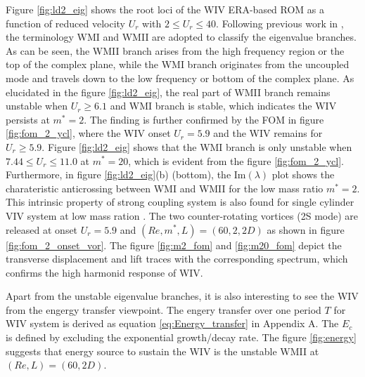 Figure \ref{fig:ld2_eig} shows the root loci of the WIV ERA-based ROM as a function of reduced 
velocity $U_r$ with $2 \le U_r \le 40$. Following previous work in \cite{yao_jfm_1}, the terminology 
WMI and WMII are adopted to classify the eigenvalue branches. As can be seen, 
the WMII branch arises from the high frequency region or the top
of the complex plane, while the WMI branch originates from the uncoupled mode and travels down to the low frequency 
or bottom of the complex plane. 
As elucidated in the figure \ref{fig:ld2_eig}, 
the real part of WMII branch remains unstable when $U_r \ge 6.1$ and WMI branch is stable, 
which indicates the WIV persists at $m^*=2$. The finding is further 
confirmed by the FOM in figure \ref{fig:fom_2_ycl}, where the WIV onset $U_r=5.9$ and the WIV remains for $U_r \ge 5.9$. 
Figure \ref{fig:ld2_eig} shows that the WMI branch is only unstable when $7.44 \le U_r \le 11.0$ at $m^*=20$, which is evident 
from the figure \ref{fig:fom_2_ycl}. 
Furthermore, in figure \ref{fig:ld2_eig}(b) (bottom), the Im$(\lambda)$ plot shows the charateristic anticrossing between WMI and WMII for 
the low mass ratio $m^*=2$. This intrinsic property of strong coupling system is also found for single cylinder VIV system at 
low mass ration \cite{yao_jfm_1}. 
The two counter-rotating vortices (2S mode) are released at onset $U_r=5.9$ and $(Re,m^*,L)=(60,2,2D)$ 
as shown in figure \ref{fig:fom_2_onset_vor}. 
The figure \ref{fig:m2_fom} and \ref{fig:m20_fom} depict the transverse displacement and lift traces with the 
corresponding spectrum, which confirms the high harmonid response of WIV. 


Apart from the unstable eigenvalue branches, it is also interesting to see the WIV from the engergy transfer viewpoint.
The engery transfer over one period $T$ for WIV system is derived as equation \ref{eq:Energy_transfer} 
in Appendix A. The $E_c$ is defined by excluding the exponential growth/decay rate. The figure \ref{fig:energy} suggests 
that energy source to sustain the WIV is the unstable WMII at $(Re,L)=(60,2D)$. 
 
